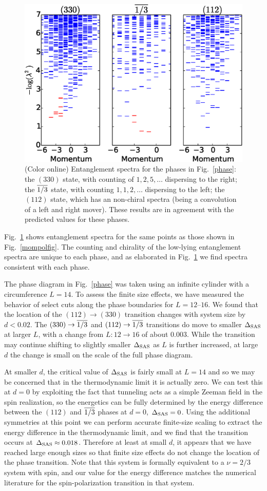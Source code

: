 \begin{figure}[t]
	\includegraphics[width=0.6\linewidth]{figures/abelian_spectra.eps}
	\caption{(Color online)
		Entanglement spectra for the phases in Fig.~\ref{phase}:
		the $(330)$ state, with counting of $1,2,5,\dots$  dispersing to the right;
		the $\overline{1/3}$ state,  with  counting $1,1,2,\dots$ dispersing to the left;
		the $(112)$ state, which has an non-chiral spectra (being a convolution of a left and right mover).
		These results are in agreement with the predicted values for these phases.
	}
	\label{spectra}
\end{figure}
Fig.~\ref{spectra} shows entanglement spectra for the same points as those shown in Fig.~\ref{mompolfig}.
The counting and chirality of the low-lying entanglement spectra are unique to each phase, and as elaborated in Fig.~\ref{spectra} we find spectra consistent with each phase.


The phase diagram in Fig.~\ref{phase} was taken using an infinite cylinder with a circumference $L=14$. 
To assess the finite size effects, we have measured the behavior of select cuts along the phase boundaries for $L=12\mbox{--}16$.
We found that the location of the $(112)\rightarrow(330)$ transition changes with system size by $d<0.02$.
The $(330) \to \overline{1/3}$ and $(112) \to \overline{1/3}$ transitions do move to smaller $\Delta_\textrm{SAS}$ at larger $L$,  with a change from $L: 12 \to 16$ of about $0.003$.
While the transition may continue shifting to slightly smaller $\Delta_\textrm{SAS}$ as $L$ is further increased, at large $d$ the change is small on the scale of the full phase diagram. 

At smaller $d$, the critical value of $\Delta_\textrm{SAS}$ is fairly small at $L=14$ and so we may be concerned that in the thermodynamic limit it is actually zero.
We can test this at $d = 0$ by exploiting the fact that tunneling acts as a simple Zeeman field in the spin realization, so the energetics can be fully determined by the energy difference between the $(112)$ and $\overline{1/3}$ phases at $d=0$, $\Delta_\textrm{SAS}=0$. 
Using the additional symmetries at this point we can perform accurate finite-size scaling to extract the energy difference in the thermodynamic limit, and we find that the transition occurs at $\Delta_\textrm{SAS}\approx0.018$.
Therefore at least at small $d$, it appears that we have reached large enough sizes so that finite size effects do not change the location of the phase transition. Note that this system is formally equivalent to a $\nu=2/3$ system with spin, and our value for the energy difference matches the numerical literature for the spin-polarization transition in that system.\cite{spinpolED}


